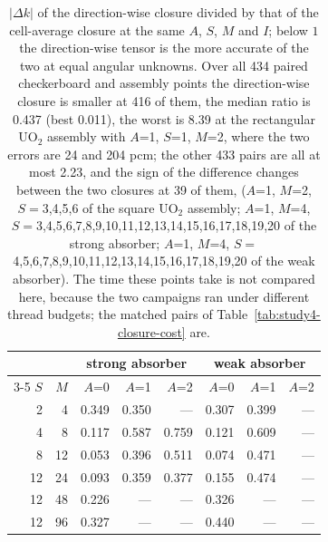 \begin{table}[htbp]
\centering
\caption{$\lvert\Delta k\rvert$ of the direction-wise closure divided by that of the
cell-average closure at the same $A$, $S$, $M$ and $I$; below $1$ the direction-wise
tensor is the more accurate of the two at equal angular unknowns. Over all
434 paired checkerboard and assembly points the direction-wise closure is
smaller at 416 of them, the median ratio is 0.437
(best 0.011), the worst is 8.39 at the rectangular UO$_2$ assembly with $A$=1, $S$=1, $M$=2, where the two errors are 24 and 204 pcm; the other 433 pairs are all at most 2.23, and the sign of the difference
changes between the two closures at 39 of them, 
($A$=1, $M$=2, $S=$3,4,5,6 of the square UO$_2$ assembly; $A$=1, $M$=4, $S=$3,4,5,6,7,8,9,10,11,12,13,14,15,16,17,18,19,20 of the strong absorber; $A$=1, $M$=4, $S=$4,5,6,7,8,9,10,11,12,13,14,15,16,17,18,19,20 of the weak absorber). The time these points take is
not compared here, because the two campaigns ran under different thread budgets; the
matched pairs of Table~\ref{tab:study4-closure-cost} are.}
\label{tab:study4-closure-ratio}
\centering\small
\begin{tabular}{rrrrrrrr}
\hline
& & \multicolumn{3}{c}{strong absorber} &
  \multicolumn{3}{c}{weak absorber}\\
\cline{3-5}\cline{6-8}
$S$ & $M$ & $A$=0 & $A$=1 & $A$=2 & $A$=0 & $A$=1 & $A$=2\\
\hline
2 & 4 & 0.349 & 0.350 & --- & 0.307 & 0.399 & ---\\
4 & 8 & 0.117 & 0.587 & 0.759 & 0.121 & 0.609 & ---\\
8 & 12 & 0.053 & 0.396 & 0.511 & 0.074 & 0.471 & ---\\
12 & 24 & 0.093 & 0.359 & 0.377 & 0.155 & 0.474 & ---\\
12 & 48 & 0.226 & --- & --- & 0.326 & --- & ---\\
12 & 96 & 0.327 & --- & --- & 0.440 & --- & ---\\
\hline
\end{tabular}
\end{table}
